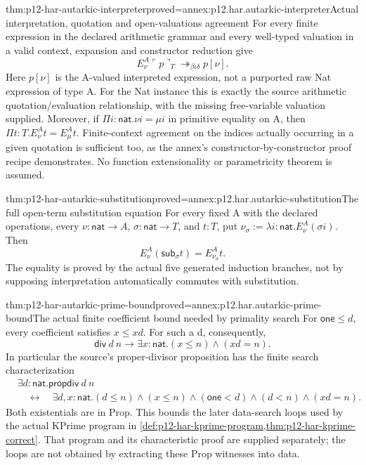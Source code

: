 \begin{hbtheorem}{thm:p12-har-autarkic-interpreter}{proved=annex:p12.har.autarkic-interpreter}{Actual interpretation, quotation and open-valuations agreement}
For every finite expression in the declared arithmetic grammar and every
well-typed valuation in a valid context, expansion and constructor reduction
give
\[
 E_\nu^A\ulcorner p\urcorner_T
            \twoheadrightarrow_{\beta\iota\delta}p[\nu].
\]
Here \(p[\nu]\) is the A-valued interpreted expression, not a
purported raw Nat expression of type A. For the Nat instance this is
exactly the source arithmetic quotation/evaluation relationship, with
the missing free-variable valuation supplied. Moreover, if
\(\Pi i:\mathsf{nat}.\nu i=\mu i\) in primitive equality on A,
then \(\Pi t:T.E_\nu^A t=E_\mu^A t\). Finite-context agreement on
the indices actually occurring in a given quotation is sufficient too,
as the annex's constructor-by-constructor proof recipe demonstrates.
No function extensionality or parametricity theorem is assumed.
\end{hbtheorem}

\begin{hbtheorem}{thm:p12-har-autarkic-substitution}{proved=annex:p12.har.autarkic-substitution}{The full open-term substitution equation}
For every fixed A with the declared operations, every
\(\nu:\mathsf{nat}\to A\), \(\sigma:\mathsf{nat}\to T\), and
\(t:T\), put \(\nu_\sigma:=\lambda i:\mathsf{nat}.E_\nu^A(\sigma i)\).
Then
\[
 E_\nu^A(\mathsf{sub}_\sigma t)=E_{\nu_\sigma}^A t.
\]
The equality is proved by the actual five generated induction branches,
not by supposing interpretation automatically commutes with substitution.
\end{hbtheorem}

\begin{hblemma}{thm:p12-har-autarkic-prime-bound}{proved=annex:p12.har.autarkic-prime-bound}{The actual finite coefficient bound needed by primality search}
For \(\mathsf{one}\le d\), every coefficient satisfies
\(x\le xd\). For such a d, consequently,
\[
 \mathsf{div}\ d\ n\to
      \exists x:\mathsf{nat}.(x\le n)\wedge(xd=n).
\]
In particular the source's proper-divisor proposition has the finite
search characterization
\[
\begin{aligned}
 &\exists d:\mathsf{nat}.\mathsf{propdiv}\ d\ n\\
 &\quad\longleftrightarrow\quad
 \exists d,x:\mathsf{nat}.
  (d\le n)\wedge(x\le n)\wedge(\mathsf{one}<d)\wedge(d<n)\wedge(xd=n).
\end{aligned}
\]
Both existentials are in Prop. This bounds the later data-search loops
used by the actual KPrime program in \cref{def:p12-har-kprime-program,thm:p12-har-kprime-correct}.
That program and its characteristic proof are supplied separately;
the loops are not obtained by extracting these Prop witnesses into data.
\end{hblemma}

